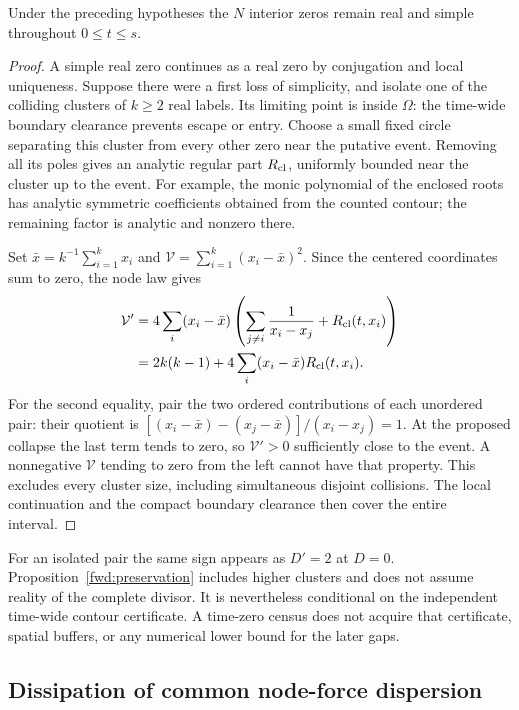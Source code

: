 \begin{proposition}
\label{fwd:preservation}
Under the preceding hypotheses the $N$ interior zeros remain real and
simple throughout $0\le t\le s$.
\end{proposition}
\begin{proof}
A simple real zero continues as a real zero by conjugation and local
uniqueness. Suppose there were a first loss of simplicity, and isolate
one of the colliding clusters of $k\ge2$ real labels. Its limiting point
is inside $\Omega$: the time-wide boundary clearance prevents escape or
entry. Choose a small fixed circle separating this cluster from every
other zero near the putative event. Removing all its poles gives an
analytic regular part $R_{\rm cl}$, uniformly bounded near the cluster
up to the event. For example, the monic polynomial of the enclosed roots
has analytic symmetric coefficients obtained from the counted contour;
the remaining factor is analytic and nonzero there.

Set $\bar x=k^{-1}\sum_{i=1}^k x_i$ and
$\mathcal V=\sum_{i=1}^k(x_i-\bar x)^2$. Since the centered coordinates
sum to zero, the node law gives
\begin{align}
 \mathcal V'
 &=4\sum_i(x_i-\bar x)
       \left(\sum_{j\ne i}\frac1{x_i-x_j}+R_{\rm cl}(t,x_i)\right)
       \notag\\
 &=2k(k-1)+4\sum_i(x_i-\bar x)R_{\rm cl}(t,x_i).
 \label{fwd:cluster-variance}
\end{align}
For the second equality, pair the two ordered contributions of each
unordered pair: their quotient is
$[(x_i-\bar x)-(x_j-\bar x)]/(x_i-x_j)=1$.
At the proposed collapse the last term tends to zero, so
$\mathcal V'>0$ sufficiently close to the event. A nonnegative
$\mathcal V$ tending to zero from the left cannot have that property.
This excludes every cluster size, including simultaneous disjoint
collisions. The local continuation and the compact boundary clearance
then cover the entire interval.
\end{proof}

For an isolated pair the same sign appears as $D'=2$ at $D=0$.
Proposition~\ref{fwd:preservation} includes higher clusters and does not
assume reality of the complete divisor. It is nevertheless conditional
on the independent time-wide contour certificate. A time-zero census
does not acquire that certificate, spatial buffers, or any numerical
lower bound for the later gaps.

\subsection{Dissipation of common node-force dispersion}

